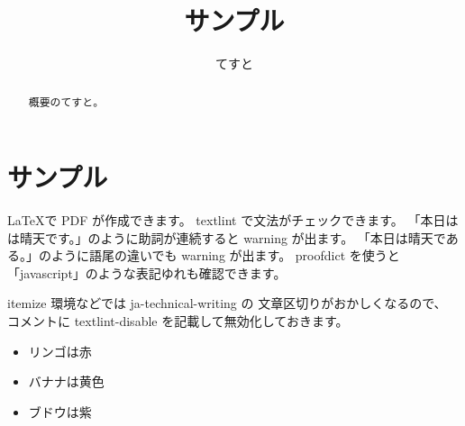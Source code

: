 \documentclass[a4paper,10pt]{ltjsarticle}
\title{サンプル}
\author{てすと}
\begin{document}
\maketitle
\begin{abstract}
  概要のてすと。
\end{abstract}
\tableofcontents

\section{サンプル}

\LaTeX で PDF が作成できます。
textlint で文法がチェックできます。
「本日はは晴天です。」のように助詞が連続すると warning が出ます。
「本日は晴天である。」のように語尾の違いでも warning が出ます。
proofdict を使うと「javascript」のような表記ゆれも確認できます。

itemize 環境などでは ja-technical-writing の
文章区切りがおかしくなるので、
コメントに textlint-disable を記載して無効化しておきます。
\begin{itemize}
  \item リンゴは赤
  \item バナナは黄色
  \item ブドウは紫
\end{itemize}
\end{document}
